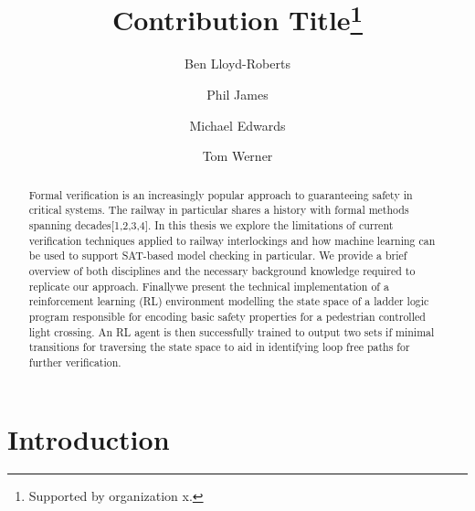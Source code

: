 \documentclass[runningheads]{llncs}
\begin{document}
%
\title{Contribution Title\thanks{Supported by organization x.}}
%
%
\author{Ben Lloyd-Roberts \and
Phil James \and
Michael Edwards \and 
Tom Werner}
%
%


%
\maketitle              %
%
\begin{abstract}
Formal verification is an increasingly popular approach to guaranteeing safety in critical systems. The railway in particular shares a history with formal methods spanning decades[1,2,3,4]. In this thesis we explore the limitations of current verification techniques applied to railway interlockings and how machine learning can be used to support SAT-based model checking in particular. We provide a brief overview of both disciplines and the necessary background knowledge required to replicate our approach. Finallywe present the technical implementation of a reinforcement learning (RL) environment modelling the state space of a ladder logic program responsible for encoding basic safety properties for a pedestrian controlled light crossing. An RL agent is then successfully trained to output two sets if minimal transitions for traversing the state space to aid in identifying loop free paths for further verification.

\end{abstract}
%
%
%
\section{Introduction}
\end{document}

